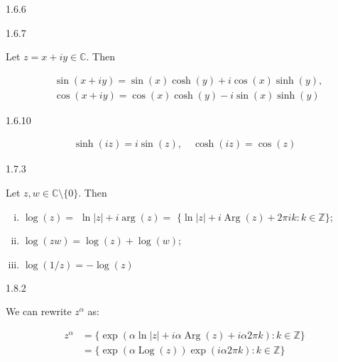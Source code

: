 \documentclass[10pt,landscape]{article}
\DeclareMathOperator{\Arg}{Arg}
\DeclareMathOperator{\Log}{Log}
\begin{document}
\begin{multicols}{3}
\begin{lemma}{1.6.6}{}
\end{lemma}

\begin{lemma}{1.6.7}{}

    Let $z = x + iy \in \mathbb{C}$. Then

        \begin{align*}
            &\sin(x + iy) = \sin(x)\cosh(y) + i\cos(x)\sinh(y), \\
            &\cos(x + iy) = \cos(x)\cosh(y) - i\sin(x)\sinh(y)
        \end{align*}

\end{lemma}

\begin{lemma}{1.6.10}{}

    \begin{align*}
        \sinh(iz) = i\sin(z), \quad \cosh(iz) = \cos(z)
    \end{align*}

\end{lemma}

\begin{lemma}{1.7.3}{}

    Let $z,w \in \mathbb{C} \setminus \{0\}$. Then

        \begin{enumerate}[(i)]
            \setlength{\parskip}{0em}
            \item $\log(z) =$ $\ln|z| + i\arg(z) =$ $ \{\ln|z| + i\Arg(z) + 2\pi i k: k \in \mathbb{Z}\}$;
            \item $\log(zw) = \log(z) + \log(w)$;
            \item $\log(1/z) = -\log(z)$
        \end{enumerate}

\end{lemma}

\begin{lemma}{1.8.2}{}

    We can rewrite $z^{\alpha}$ as:

        \begin{align*}
            z^{\alpha} &= \{\exp(\alpha \ln|z| + i\alpha\Arg(z) + i \alpha 2\pi k): k \in \mathbb{Z}\} \\
                       &= \{\exp(\alpha \Log(z))\exp(i\alpha 2\pi k) : k \in \mathbb{Z}\}
        \end{align*}


\end{lemma}
\end{multicols}
\end{document}

